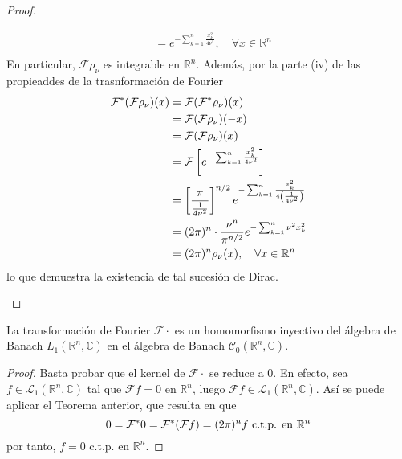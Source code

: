 \documentclass[12pt]{report}
\theoremstyle{largebreak}
\newcommand{\fou}[1]{\ensuremath{\mathcal{F}#1}}
\begin{document}
\begin{proof}
\begin{enumerate}
\begin{equation*}
\begin{split}
                    &=e^{ -\sum_{ k=1}^n \frac{x_k^2}{4\nu^2}},\quad\forall x\in\mathbb{R}^n \\
                \end{split}
            \end{equation*}
            En particular, $\fou{\rho_\nu}$ es integrable en $\mathbb{R}^n$. Además, por la parte (iv) de las propieaddes de la trasnformación de Fourier
            \begin{equation*}
                \begin{split}
                    \fou^*{(\fou{\rho_\nu})}(x)&=\fou{(\fou^*{\rho_\nu})}(x)\\
                    &=\fou{(\fou{\rho_\nu})}(-x)\\
                    &=\fou{(\fou{\rho_\nu})}(x)\\
                    &=\fou{\left[e^{ -\sum_{ k=1}^n \frac{x_k^2}{4\nu^2}} \right]}\\
                    &=\left[\frac{\pi}{\frac{1}{4\nu^2}}\right]^{ n/2}e^{-\sum_{ k=1}^n \frac{x_k^2}{4\left(\frac{1}{4\nu^2}\right)}}\\
                    &=(2\pi)^n\cdot\frac{\nu^n}{\pi^{n/2}}e^{ -\sum_{ k=1}^n \nu^2 x_k^2}\\
                    &=(2\pi)^n\rho_\nu(x),\quad\forall x\in\mathbb{R}^n\\
                \end{split}
            \end{equation*}
            lo que demuestra la existencia de tal sucesión de Dirac.
        \end{enumerate}
    \end{proof}

    \begin{propo}
        La transformación de Fourier $\fou{\cdot}$ es un homomorfismo inyectivo del álgebra de Banach $L_1(\mathbb{R}^n,\mathbb{C})$ en el álgebra de Banach $\mathcal{C}_0(\mathbb{R}^n,\mathbb{C})$.
    \end{propo}

    \begin{proof}
        Basta probar que el kernel de $\fou{\cdot}$ se reduce a $0$. En efecto, sea $f\in\mathcal{L}_1(\mathbb{R}^n,\mathbb{C})$ tal que $\fou{f}=0$ en $\mathbb{R}^n$, luego $\fou{f}\in\mathcal{L}_1(\mathbb{R}^n,\mathbb{C})$. Así se puede aplicar el Teorema anterior, que resulta en que
        \begin{equation*}
            0=\fou^*{0}=\fou^*{(\fou{f})}=(2\pi)^nf\textup{ c.t.p. en }\mathbb{R}^n
        \end{equation*}
        por tanto, $f=0$ c.t.p. en $\mathbb{R}^n$.
    \end{proof}
\end{document}
